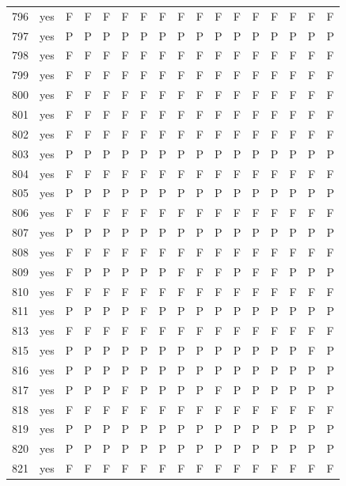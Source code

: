 \begin{table}[p]
\begin{tabular*}{\textwidth}{@{\extracolsep{\fill}}rcccccccccccccccc}
796 & yes & F & F & F & F & F & F & F & F & F & F & F & F & F & F & F\\
797 & yes & P & P & P & P & P & P & P & P & P & P & P & P & P & P & P\\
798 & yes & F & F & F & F & F & F & F & F & F & F & F & F & F & F & F\\
799 & yes & F & F & F & F & F & F & F & F & F & F & F & F & F & F & F\\
800 & yes & F & F & F & F & F & F & F & F & F & F & F & F & F & F & F\\
801 & yes & F & F & F & F & F & F & F & F & F & F & F & F & F & F & F\\
802 & yes & F & F & F & F & F & F & F & F & F & F & F & F & F & F & F\\
803 & yes & P & P & P & P & P & P & P & P & P & P & P & P & P & P & P\\
804 & yes & F & F & F & F & F & F & F & F & F & F & F & F & F & F & F\\
805 & yes & P & P & P & P & P & P & P & P & P & P & P & P & P & P & P\\
806 & yes & F & F & F & F & F & F & F & F & F & F & F & F & F & F & F\\
807 & yes & P & P & P & P & P & P & P & P & P & P & P & P & P & P & P\\
808 & yes & F & F & F & F & F & F & F & F & F & F & F & F & F & F & F\\
809 & yes & F & P & P & P & P & P & F & F & F & P & F & F & P & P & P\\
810 & yes & F & F & F & F & F & F & F & F & F & F & F & F & F & F & F\\
811 & yes & P & P & P & P & F & P & P & P & P & P & P & P & P & P & P\\
813 & yes & F & F & F & F & F & F & F & F & F & F & F & F & F & F & F\\
815 & yes & P & P & P & P & P & P & P & P & P & P & P & P & P & F & P\\
816 & yes & P & P & P & P & P & P & P & P & P & P & P & P & P & P & P\\
817 & yes & P & P & P & F & P & P & P & P & F & P & P & P & P & P & P\\
818 & yes & F & F & F & F & F & F & F & F & F & F & F & F & F & F & F\\
819 & yes & P & P & P & P & P & P & P & P & P & P & P & P & P & P & P\\
820 & yes & P & P & P & P & P & P & P & P & P & P & P & P & P & P & P\\
821 & yes & F & F & F & F & F & F & F & F & F & F & F & F & F & F & F\\
\bottomrule\end{tabular*}\end{table}
\clearpage

